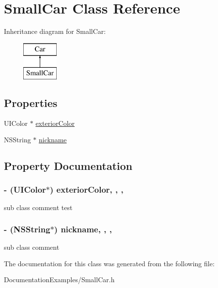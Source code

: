 \hypertarget{interface_small_car}{}\section{Small\+Car Class Reference}
\label{interface_small_car}
Inheritance diagram for Small\+Car\+:\begin{figure}[H]
\begin{center}
\leavevmode
\includegraphics[height=2.000000cm]{de/dcf/interface_small_car}
\end{center}
\end{figure}
\subsection*{Properties}
\begin{DoxyCompactItemize}
\item 
U\+I\+Color $\ast$ \hyperlink{interface_small_car_a286abaea6871cde85bacc2e47fc31919}{exterior\+Color}
\item 
N\+S\+String $\ast$ \hyperlink{interface_small_car_ad1033f82517211f319f7b32ca0008f9a}{nickname}
\end{DoxyCompactItemize}


\subsection{Property Documentation}
\hypertarget{interface_small_car_a286abaea6871cde85bacc2e47fc31919}{}
\subsubsection[{exterior\+Color}]{\setlength{\rightskip}{0pt plus 5cm}-\/ (U\+I\+Color$\ast$) exterior\+Color\hspace{0.3cm}{\ttfamily [read]}, {\ttfamily [write]}, {\ttfamily [nonatomic]}, {\ttfamily [assign]}}\label{interface_small_car_a286abaea6871cde85bacc2e47fc31919}
sub class comment test \hypertarget{interface_small_car_ad1033f82517211f319f7b32ca0008f9a}{}
\subsubsection[{nickname}]{\setlength{\rightskip}{0pt plus 5cm}-\/ (N\+S\+String$\ast$) nickname\hspace{0.3cm}{\ttfamily [read]}, {\ttfamily [write]}, {\ttfamily [nonatomic]}, {\ttfamily [assign]}}\label{interface_small_car_ad1033f82517211f319f7b32ca0008f9a}
sub class comment 

The documentation for this class was generated from the following file\+:\begin{DoxyCompactItemize}
\item 
Documentation\+Examples/Small\+Car.\+h\end{DoxyCompactItemize}
